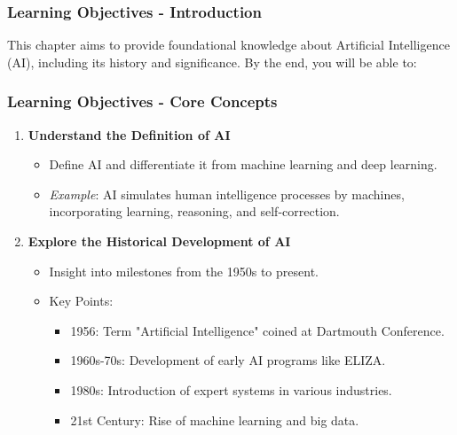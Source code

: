 \documentclass[aspectratio=169]{beamer}
\begin{document}
\begin{frame}[fragile]
    \frametitle{Learning Objectives - Introduction}
    This chapter aims to provide foundational knowledge about Artificial Intelligence (AI), including its history and significance. By the end, you will be able to:
\end{frame}

\begin{frame}[fragile]
    \frametitle{Learning Objectives - Core Concepts}
    \begin{enumerate}
        \item \textbf{Understand the Definition of AI}
        \begin{itemize}
            \item Define AI and differentiate it from machine learning and deep learning.
            \item \textit{Example}: AI simulates human intelligence processes by machines, incorporating learning, reasoning, and self-correction.
        \end{itemize}
        
        \item \textbf{Explore the Historical Development of AI}
        \begin{itemize}
            \item Insight into milestones from the 1950s to present.
            \item Key Points:
            \begin{itemize}
                \item 1956: Term "Artificial Intelligence" coined at Dartmouth Conference.
                \item 1960s-70s: Development of early AI programs like ELIZA.
                \item 1980s: Introduction of expert systems in various industries.
                \item 21st Century: Rise of machine learning and big data.
            \end{itemize}
        \end{itemize}
    \end{enumerate}
\end{frame}
\end{document}
